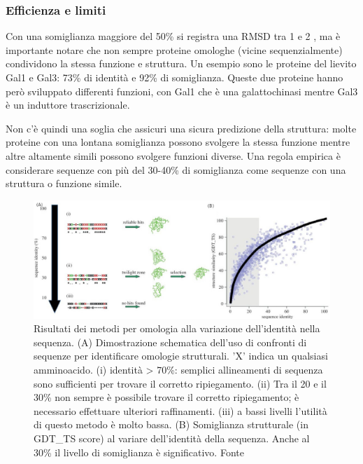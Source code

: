{	\subsubsection{Efficienza e limiti}
	
	Con una somiglianza maggiore del 50\% si registra una RMSD tra 1 e 2 \angstrom, ma è importante notare che non sempre proteine omologhe (vicine sequenzialmente) condividono la stessa funzione e struttura. Un esempio sono le proteine del lievito Gal1 e Gal3: 73\% di identità e 92\% di somiglianza. Queste due proteine hanno però sviluppato differenti funzioni, con Gal1 che è una galattochinasi mentre Gal3 è un induttore trascrizionale\supercite{platt2000insertion}.
	
	\par Non c'è quindi una soglia che assicuri una sicura predizione della struttura: molte proteine con una lontana somiglianza possono svolgere la stessa funzione mentre altre altamente simili possono svolgere funzioni diverse. Una regola empirica è considerare sequenze con più del 30-40\% di somiglianza come sequenze con una struttura o funzione simile.
	
	\begin{figure}[!htb]
		\centering
		\includegraphics[scale=1.2]{images/homology-grafico.jpg}
		\caption{Risultati dei metodi per omologia alla variazione dell'identità nella sequenza. (A) Dimostrazione schematica dell'uso di confronti di sequenze per identificare omologie strutturali. 'X' indica un qualsiasi amminoacido. (i) identità > 70\%: semplici allineamenti di sequenza sono sufficienti per trovare il corretto ripiegamento. (ii) Tra il 20 e il 30\% non sempre è possibile trovare il corretto ripiegamento; è necessario effettuare ulteriori raffinamenti. (iii) a bassi livelli l'utilità di questo metodo è molto bassa. (B) Somiglianza strutturale (in GDT\_TS score) al variare dell'identità della sequenza. Anche al 30\% il livello di somiglianza è significativo. Fonte\cite{joseph2014local}}
		\label{fig:omologia-grafico}
	\end{figure}
	
}
